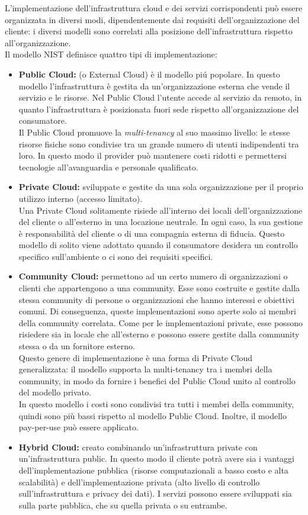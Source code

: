 \documentclass{article}
\begin{document}
L’implementazione dell’infrastruttura cloud e dei servizi corrispondenti può essere organizzata in diversi modi, dipendentemente dai requisiti dell’organizzazione del cliente: i diversi modelli sono correlati alla posizione dell’infrastruttura rispetto all’organizzazione.\\
Il modello NIST definisce quattro tipi di implementazione:
\begin{itemize}
    \item \textbf{Public Cloud:} (o External Cloud) è il modello piú popolare. In questo modello l’infrastruttura è gestita da un’organizzazione esterna che vende il servizio e le risorse. Nel Public Cloud l’utente accede al servizio da remoto, in quanto l’infrastruttura è posizionata fuori sede rispetto all’organizzazione del consumatore.\\ Il Public Cloud promuove la \textit{multi-tenancy} al suo massimo livello: le stesse risorse fisiche sono condivise tra un grande numero di utenti indipendenti tra loro. In questo modo il provider può mantenere costi ridotti e permettersi tecnologie all’avanguardia e personale qualificato.
    \item \textbf{Private Cloud:} sviluppate e gestite da una sola organizzazione per il proprio utilizzo interno (accesso limitato).\\ Una Private Cloud solitamente risiede all’interno dei locali dell’organizzazione del cliente o all’esterno in una locazione neutrale. In ogni caso, la sua gestione è responsabilità del cliente o di una compagnia esterna di fiducia. Questo modello di solito viene adottato quando il consumatore desidera un controllo specifico sull’ambiente o ci sono dei requisiti specifici.
    \item \textbf{Community Cloud:} permettono ad un certo numero di organizzazioni o clienti che appartengono a una community. Esse sono costruite e gestite dalla stessa community di persone o organizzazioni che hanno interessi e obiettivi comuni. Di conseguenza, queste implementazioni sono aperte solo ai membri della community correlata. Come per le implementazioni private, esse possono risiedere sia in locale che all’esterno e possono essere gestite dalla community stessa o da un fornitore esterno.\\ Questo genere di implementazione è una forma di Private Cloud generalizzata: il modello supporta la multi-tenancy tra i membri della community, in modo da fornire i benefici del Public Cloud unito al controllo del modello privato.\\ In questo modello i costi sono condivisi tra tutti i membri della community, quindi sono più bassi rispetto al modello Public Cloud. Inoltre, il modello pay-per-use può essere applicato.
    \item \textbf{Hybrid Cloud:} creato combinando un’infrastruttura private con un’infrastruttura public. In questo modo il cliente potrà avere sia i vantaggi dell’implementazione pubblica (risorse computazionali a basso costo e alta scalabilità) e dell’implementazione privata (alto livello di controllo sull’infrastruttura e privacy dei dati). I servizi possono essere sviluppati sia sulla parte pubblica, che su quella privata o su entrambe.
\end{itemize}
\end{document}
